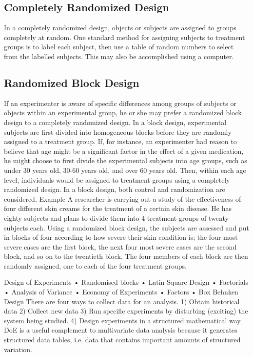 \begin{itemize}
\subsection{Completely Randomized Design}
In a completely randomized design, objects or subjects are assigned to groups completely at random. One standard method for assigning subjects to treatment groups is to label each subject, then use a table of random numbers to select from the labelled subjects. This may also be accomplished using a computer. 
\subsection{Randomized Block Design}
If an experimenter is aware of specific differences among groups of subjects or objects within an experimental group, he or she may prefer a randomized block design to a completely randomized design. In a block design, experimental subjects are first divided into homogeneous blocks before they are randomly assigned to a treatment group. If, for instance, an experimenter had reason to believe that age might be a significant factor in the effect of a given medication, he might choose to first divide the experimental subjects into age groups, such as under 30 years old, 30-60 years old, and over 60 years old. 
Then, within each age level, individuals would be assigned to treatment groups using a completely randomized design. 
In a block design, both control and randomization are considered.
Example
A researcher is carrying out a study of the effectiveness of four different skin creams for the treatment of a certain skin disease. He has eighty subjects and plans to divide them into 4 treatment groups of twenty subjects each. 
Using a randomized block design, the subjects are assessed and put in blocks of four according to how severe their skin condition is; the four most severe cases are the first block, the next four most severe cases are the second block, and so on to the twentieth block. The four members of each block are then randomly assigned, one to each of the four treatment groups. 


Design of Experiments
•	Randomised blocks
•	Latin Square Design
•	Factorials
•	Analysis of Variance
•	Economy of Experiments
•	Factors
•	Box Behnken Design
There are four ways to collect data for an analysis.
1)	Obtain historical data
2)	Collect new data
3)	Run specific experiments by disturbing (exciting) the system being studied.
4)	Design experiments in a structured mathematical way.
DoE is a useful complement to multivariate data analysis because it generates  structured data tables, i.e. data that contains important amounts of structured variation.


\end{itemize}
